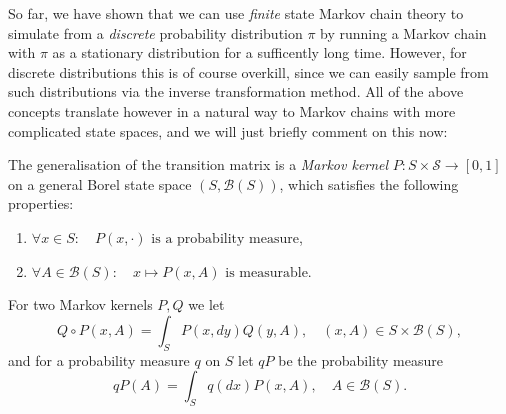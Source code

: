 \documentclass[
]{book}
\theoremstyle{definition}
\theoremstyle{definition}
\theoremstyle{definition}
\theoremstyle{definition}
\theoremstyle{remark}
\begin{document}
So far, we have shown that we can use \textit{finite }state Markov chain theory to simulate from a \textit{discrete} probability distribution \(\pi\) by running a Markov chain with \(\pi\) as a stationary distribution for a sufficently long time. However, for discrete distributions this is of course overkill, since we can easily sample from such distributions via the inverse transformation method. All of the above concepts translate however in a natural way to Markov chains with more complicated state spaces, and we will just briefly comment on this now: 

The generalisation of the transition matrix is a \textit{Markov kernel} \(P \colon S \times \mathcal{S} \to [0,1]\) on a general Borel state space \((S,\mathcal{B}(S))\), which satisfies the following properties: 

\begin{enumerate} 
\item \(\forall x \in S: \quad P(x, \cdot) \text{ is a probability measure}\), 
\item \(\forall A \in \mathcal{B}(S): \quad x \mapsto P(x, A) \text{ is measurable.}\)
\end{enumerate}

For two Markov kernels \(P,Q\) we let 
\[Q\circ P(x,A) = \int_{S} P(x, dy ) Q(y,A), \quad (x,A) \in S \times \mathcal{B}(S),\]
and for a probability measure \(q\) on \(S\) let \(qP\) be the probability measure
\[qP(A) = \int_S q(dx) P(x,A), \quad A \in \mathcal{B}(S).\]
\end{document}
